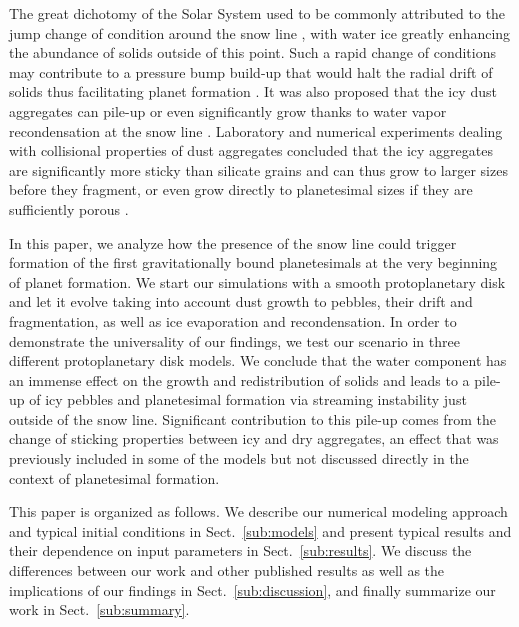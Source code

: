 \documentclass{aa}
\begin{document}
The great dichotomy of the Solar System used to be commonly attributed to the jump change of condition around the snow line \citep{1988Icar...75..146S, 2000prpl.conf.1081W, 2015Icar..258..418M}, with water ice greatly enhancing the abundance of solids outside of this point. 
Such a rapid change of conditions may contribute to a pressure bump build-up that would halt the radial drift of solids thus facilitating planet formation \citep{2007ApJ...664L..55K, 2008A&A...487L...1B, 2013A&A...556A..37D}.
It was also proposed that the icy dust aggregates can pile-up \citep{2004ApJ...614..490C} or even significantly grow thanks to water vapor recondensation at the snow line \citep{2013A&A...552A.137R,  2015MNRAS.449.1084W}. Laboratory and numerical experiments dealing with collisional properties of dust aggregates concluded that the icy aggregates are significantly more sticky than silicate grains \citep{2011ApJ...737...36W, 2011Icar..214..717G} and can thus grow to larger sizes before they fragment, or even grow directly to planetesimal sizes if they are sufficiently porous \citep{2012ApJ...752..106O, 2013A&A...557L...4K}.

In this paper, we analyze how the presence of the snow line could trigger formation of the first gravitationally bound planetesimals at the very beginning of planet formation. We start our simulations with a smooth protoplanetary disk and let it evolve taking into account dust growth to pebbles, their drift and fragmentation, as well as ice evaporation and recondensation. In order to demonstrate the universality of our findings, we test our scenario in three different protoplanetary disk models. We conclude that the water component has an immense effect on the growth and redistribution of solids and leads to a pile-up of icy pebbles and planetesimal formation via streaming instability just outside of the snow line. Significant contribution to this pile-up comes from the change of sticking properties between icy and dry aggregates, an effect that was previously included in some of the models \citep{2010A&A...513A..79B, 2015ApJ...815L..15B, 2016ApJ...818..200E, 2017MNRAS.465.3865C} but not discussed directly in the context of planetesimal formation. 

This paper is organized as follows. We describe our numerical modeling approach and typical initial conditions in Sect.~\ref{sub:models} and present typical results and their dependence on input parameters in Sect.~\ref{sub:results}. We discuss the differences between our work and other published results as well as the implications of our findings in Sect.~\ref{sub:discussion}, and finally summarize our work in Sect.~\ref{sub:summary}.
\end{document}
